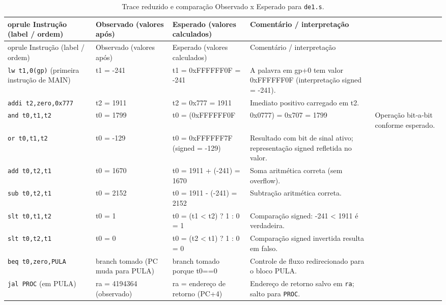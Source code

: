 \documentclass[12pt,a4paper]{article}
\begin{document}
\begin{longtable}{p{4.5cm} p{3.2cm} p{3.2cm} p{5.5cm}}
\caption{Trace reduzido e comparação Observado x Esperado para \texttt{de1.s}.}\\
	oprule
Instrução (label / ordem) & Observado (valores após) & Esperado (valores calculados) & Comentário / interpretação \\
\midrule
\endfirsthead
	oprule
Instrução (label / ordem) & Observado (valores após) & Esperado (valores calculados) & Comentário / interpretação \\
\midrule
\endhead

\lstinline|lw t1,0(gp)| (primeira instrução de MAIN) & t1 = -241 & t1 = 0xFFFFFF0F = -241 & A palavra em gp+0 tem valor 0xFFFFFF0F (interpretação signed = -241). \\

\lstinline|addi t2,zero,0x777| & t2 = 1911 & t2 = 0x777 = 1911 & Imediato positivo carregado em t2. \\

\lstinline|and t0,t1,t2| & t0 = 1799 & t0 = (0xFFFFFF0F & 0x0777) = 0x707 = 1799 & Operação bit‑a‑bit conforme esperado. \\

\lstinline|or t0,t1,t2| & t0 = -129 & t0 = 0xFFFFFF7F (signed = -129) & Resultado com bit de sinal ativo; representação signed refletida no valor. \\

\lstinline|add t0,t2,t1| & t0 = 1670 & t0 = 1911 + (-241) = 1670 & Soma aritmética correta (sem overflow). \\

\lstinline|sub t0,t2,t1| & t0 = 2152 & t0 = 1911 - (-241) = 2152 & Subtração aritmética correta. \\

\lstinline|slt t0,t1,t2| & t0 = 1 & t0 = (t1 < t2) ? 1 : 0 = 1 & Comparação signed: -241 < 1911 é verdadeira. \\

\lstinline|slt t0,t2,t1| & t0 = 0 & t0 = (t2 < t1) ? 1 : 0 = 0 & Comparação signed invertida resulta em falso. \\

\lstinline|beq t0,zero,PULA| & branch tomado (PC muda para PULA) & branch tomado porque t0==0 & Controle de fluxo redirecionado para o bloco PULA. \\

\lstinline|jal PROC| (em PULA) & ra = 4194364 (observado) & ra = endereço de retorno (PC+4) & Endereço de retorno salvo em \texttt{ra}; salto para \texttt{PROC}. \\


\end{longtable}
\end{document}
